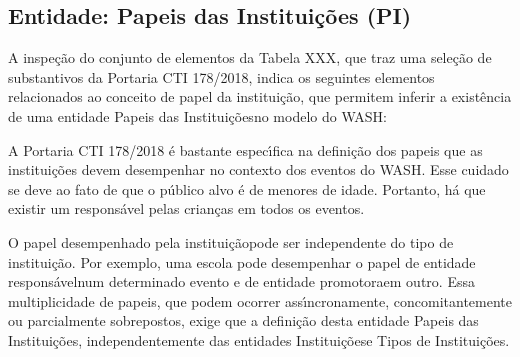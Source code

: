 \documentclass[
12pt,		%
openright,	%
twoside,  %
a4paper,			%
chapter=TITLE,		%
english,			%
french,				%
spanish,			%
brazil				%
]{USPSC-classe/USPSC}
\begin{document}
\subsection[Entidade: Papeis das Institui\c{c}\~oes (PI)]{Entidade: Papeis das Institui\c{c}\~oes (PI)}\label{Entidade: Papeis das Institui\c{c}\~oes (PI)}
A inspe\c{c}\~ao do conjunto de elementos da Tabela XXX, que traz uma sele\c{c}\~ao de substantivos da Portaria CTI 178/2018, indica os seguintes elementos relacionados ao conceito de \textquotedbl papel da institui\c{c}\~ao\textquotedbl , que permitem inferir a exist\^encia de uma entidade \textquotedbl Papeis das Institui\c{c}\~oes\textquotedbl  no modelo do WASH:











\noindent\begin{center}\mbox{\centering{}}\end{center}


A Portaria CTI 178/2018 \'e bastante espec\'{\i}fica na defini\c{c}\~ao dos papeis que as institui\c{c}\~oes devem desempenhar no contexto dos eventos do WASH. Esse cuidado se deve ao fato de que o p\'ublico alvo \'e de menores de idade. Portanto, h\'a que existir um respons\'avel pelas crian\c{c}as em todos os eventos.










O \textquotedbl papel desempenhado pela institui\c{c}\~ao\textquotedbl  pode ser independente do \textquotedbl tipo de institui\c{c}\~ao\textquotedbl . Por exemplo, uma escola pode desempenhar o papel de \textquotedbl entidade respons\'avel\textquotedbl  num determinado evento e de \textquotedbl entidade promotora\textquotedbl  em outro. Essa multiplicidade de papeis, que podem ocorrer ass\'{\i}ncronamente, concomitantemente ou parcialmente sobrepostos, exige que a defini\c{c}\~ao desta entidade \textquotedbl Papeis das Institui\c{c}\~oes\textquotedbl , independentemente das entidades \textquotedbl Institui\c{c}\~oes\textquotedbl  e \textquotedbl Tipos de Institui\c{c}\~oes\textquotedbl .
\end{document}
